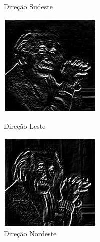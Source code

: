 \documentclass[a4paper, 12pt]{article}
\begin{document}
\begin{figure}[!htb]
	  	\caption{Direção Sudeste}
	\endminipage\hspace{1cm}
		\includegraphics[width=\linewidth]{images/robinson7.jpg}
		\caption{Direção Leste}
  	\endminipage\hspace{1cm}
  		\includegraphics[width=\linewidth]{images/robinson8.jpg}
  		\caption{Direção Nordeste}
	\endminipage
\end{figure}
\end{document}
